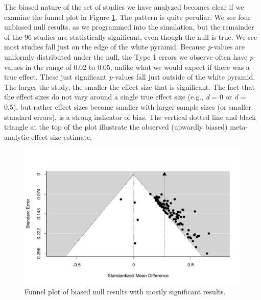 \documentclass[
  oneside]{krantz}
\begin{document}
The biased nature of the set of studies we have analyzed becomes clear if we examine the funnel plot in Figure \ref{fig:funnel2}. The pattern is quite peculiar. We see four unbiased null results, as we programmed into the simulation, but the remainder of the 96 studies are statistically significant, even though the null is true. We see most studies fall just on the edge of the white pyramid. Because \emph{p}-values are uniformly distributed under the null, the Type 1 errors we observe often have \emph{p}-values in the range of 0.02 to 0.05, unlike what we would expect if there was a true effect. These just significant \emph{p}-values fall just outside of the white pyramid. The larger the study, the smaller the effect size that is significant. The fact that the effect sizes do not vary around a single true effect size (e.g., \emph{d} = 0 or \emph{d} = 0.5), but rather effect sizes become smaller with larger sample sizes (or smaller standard errors), is a strong indicator of bias. The vertical dotted line and black triangle at the top of the plot illustrate the observed (upwardly biased) meta-analytic effect size estimate.



\begin{figure}

{\centering \includegraphics[width=1\linewidth]{12-bias_files/figure-latex/funnel2-1} 

}

\caption{Funnel plot of biased null results with mostly significant results.}\label{fig:funnel2}
\end{figure}
\end{document}
